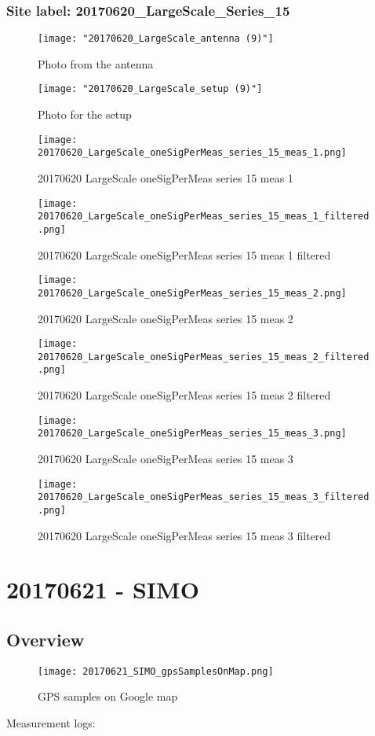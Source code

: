 \subsubsection{Site label: 20170620\_LargeScale\_Series\_15}
\begin{figure}[ht] \caption{Photo from the antenna}
\texttt{[image: "20170620\_LargeScale\_antenna (9)"]}\centering\end{figure}
\begin{figure}[ht] \caption{Photo for the setup}
\texttt{[image: "20170620\_LargeScale\_setup (9)"]}\centering\end{figure}
\begin{figure}[ht] \caption{20170620 LargeScale oneSigPerMeas series 15 meas 1}
\texttt{[image: 20170620\_LargeScale\_oneSigPerMeas\_series\_15\_meas\_1.png]}\centering\end{figure}
\begin{figure}[ht] \caption{20170620 LargeScale oneSigPerMeas series 15 meas 1 filtered}
\texttt{[image: 20170620\_LargeScale\_oneSigPerMeas\_series\_15\_meas\_1\_filtered.png]}\centering\end{figure}
\begin{figure}[ht] \caption{20170620 LargeScale oneSigPerMeas series 15 meas 2}
\texttt{[image: 20170620\_LargeScale\_oneSigPerMeas\_series\_15\_meas\_2.png]}\centering\end{figure}
\begin{figure}[ht] \caption{20170620 LargeScale oneSigPerMeas series 15 meas 2 filtered}
\texttt{[image: 20170620\_LargeScale\_oneSigPerMeas\_series\_15\_meas\_2\_filtered.png]}\centering\end{figure}
\begin{figure}[ht] \caption{20170620 LargeScale oneSigPerMeas series 15 meas 3}
\texttt{[image: 20170620\_LargeScale\_oneSigPerMeas\_series\_15\_meas\_3.png]}\centering\end{figure}
\begin{figure}[ht] \caption{20170620 LargeScale oneSigPerMeas series 15 meas 3 filtered}
\texttt{[image: 20170620\_LargeScale\_oneSigPerMeas\_series\_15\_meas\_3\_filtered.png]}\centering\end{figure}
\clearpage
\section{20170621 - SIMO}
\subsection{Overview}
\begin{figure}[ht] \caption{GPS samples on Google map}
\texttt{[image: 20170621\_SIMO\_gpsSamplesOnMap.png]}\centering\end{figure}
\begin{minipage}{\textwidth} Measurement logs:

 \end{minipage}
\clearpage
